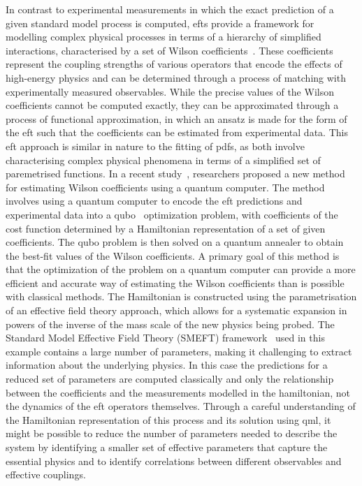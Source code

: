 In contrast to experimental measurements in which the exact prediction of a given standard model process is computed, \gls{efts} provide a framework for modelling complex physical processes in terms of a hierarchy of simplified interactions, characterised by a set of Wilson coefficients~\cite{Lang:2021hnd}.
These coefficients represent the coupling strengths of various operators that encode the effects of high-energy physics and can be determined through a process of matching with experimentally measured observables.
While the precise values of the Wilson coefficients cannot be computed exactly, they can be approximated through a process of functional approximation, in which an ansatz is made for the form of the \gls{eft} such that the coefficients can be estimated from experimental data.
This \gls{eft} approach is similar in nature to the fitting of \gls{pdfs}, as both involve characterising complex physical phenomena in terms of a simplified set of paremetrised functions. 
In a recent study~\cite{Criado:2022aoo}, researchers proposed a new method for estimating Wilson coefficients using a quantum computer. The method involves using a quantum computer to encode the \gls{eft} predictions and experimental data into a \gls{qubo}~\cite{QUBO} optimization problem, with coefficients of the cost function determined by a Hamiltonian representation of a set of given coefficients. The \gls{qubo} problem is then solved on a quantum annealer to obtain the best-fit values of the Wilson coefficients. A primary goal of this method is that the optimization of the problem on a quantum computer can provide a more efficient and accurate way of estimating the Wilson coefficients than is possible with classical methods. 
The Hamiltonian is constructed using the parametrisation of an effective field theory approach, which allows for a systematic expansion in powers of the inverse of the mass scale of the new physics being probed.
The Standard Model Effective Field Theory (SMEFT) framework~\cite{SMEFT} used in this example contains a large number of parameters, making it challenging to extract information about the underlying physics. 
In this case the predictions for a reduced set of parameters are computed classically and only the relationship between the coefficients and the measurements modelled in the hamiltonian, not the dynamics of the \gls{eft} operators themselves.
Through a careful understanding of the Hamiltonian representation of this process and its solution using \gls{qml}, it might be possible to reduce the number of parameters needed to describe the system by identifying a smaller set of effective parameters that capture the essential physics and to identify correlations between different observables and effective couplings.

